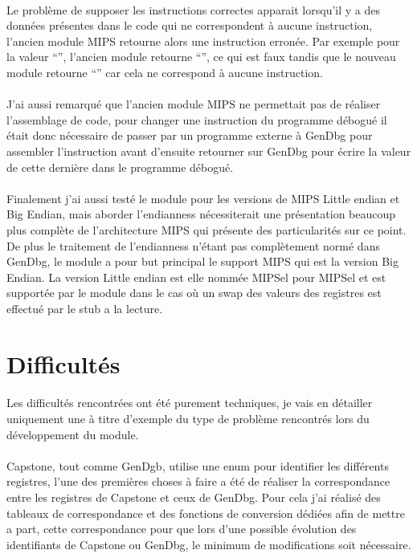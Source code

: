 \documentclass[11pt, book, english, french, standardlists]{upmethodology-document}
\begin{document}
				\paragraph*{}
					Le problème de supposer les instructions correctes apparait lorsqu'il y a des données présentes dans le code qui ne correspondent à aucune instruction, l'ancien module \gls{MIPS} retourne alors une instruction erronée. Par exemple pour la valeur ``'', l'ancien module retourne ``'', ce qui est faux tandis que le nouveau module retourne ``'' car cela ne correspond à aucune instruction.
				\paragraph*{}
					J'ai aussi remarqué que l'ancien module MIPS ne permettait pas de réaliser l'assemblage de code, pour changer une instruction du programme débogué il était donc nécessaire de passer par un programme externe à GenDbg pour assembler l'instruction avant d'ensuite retourner sur GenDbg pour écrire la valeur de cette dernière dans le programme débogué.
				\paragraph*{}
					Finalement j'ai aussi testé le module pour les versions de \gls{MIPS} Little endian et Big Endian, mais aborder l'endianness nécessiterait une présentation beaucoup plus complète de l'architecture \gls{MIPS} qui présente des particularités sur ce point. De plus le traitement de l'endianness n'étant pas complètement normé dans GenDbg, le module a pour but principal le support MIPS qui est la version Big Endian. La version Little endian est elle nommée \acrshort{MIPSel} pour \acrlong{MIPSel} et est supportée par le module dans le cas où un swap des valeurs des registres est effectué par le stub a la lecture.
		\section{Difficultés}
			\paragraph*{}
				Les difficultés rencontrées ont été purement techniques, je vais en détailler uniquement une à titre d'exemple du type de problème rencontrés lors du développement du module.
			\paragraph*{}
				Capstone, tout comme GenDgb, utilise une enum pour identifier les différents registres, l'une des premières choses à faire a été de réaliser la correspondance entre les registres de Capstone et ceux de GenDbg. Pour cela j'ai réalisé des tableaux de correspondance et des fonctions de conversion dédiées afin de mettre a part, cette correspondance pour que lors d'une possible évolution des identifiants de Capstone ou GenDbg, le minimum de modifications soit nécessaire.
\end{document}
